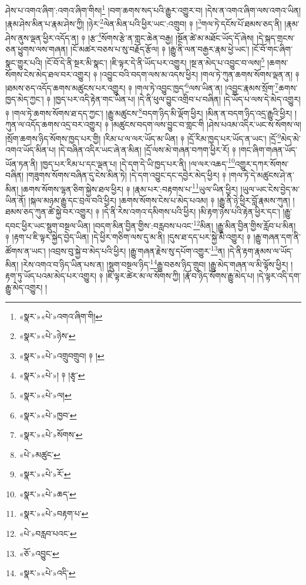 ཤེས་པ་འགའ་ཞིག་:འགའ་ཞིག་གིས།\footnote{«སྣར་»«པེ་»འགའ་ཞིག་གི།} །བག་ཆགས་སད་པའི་རྒྱུར་འགྱུར་བ། །དེས་ན་འགའ་ཞིག་ལས་འགའ་ཡིན། །རྣམ་ཤེས་མིན་པ་རྣམ་ཤེས་ཀྱི། །ཉེར་\footnote{«སྣར་»«པེ་»ཉེས་}ལེན་མིན་པའི་ཕྱིར་ཡང་:འགྲུབ། ༈ །\footnote{«སྣར་»«པེ་»འགྲུབགྲུབ། ༈ །}གལ་ཏེ་དངོས་པོ་ཐམས་ཅད་ནི། །རྣམ་ཤེས་ནུས་ལྡན་ཕྱིར་འདོད་ན། ༈ །རྩ་\footnote{«སྣར་»«པེ་»། ༈ །རྩྭ་}སོགས་རྩེ་ན་གླང་ཆེན་བརྒྱ། །སྔོན་ཚེ་མ་མཐོང་ཡོད་དོ་ཞེས། །དེ་སྐད་གྲངས་ཅན་ཕྱུགས་ལས་གཞན། །ངོ་མཚར་བཅས་པ་སུ་བརྗོད་རྩོལ། ༈ །རྒྱུ་ནི་ལན་བརྒྱར་རྣམ་ཕྱེ་ཡང་། །ངོ་བོ་གང་ཞིག་སྣང་གྱུར་པའི། །ངོ་བོ་དེ་ནི་སྔར་མི་སྣང་། །ཇི་ལྟར་དེ་ནི་ཡོད་པར་འགྱུར། །སྔ་ན་མེད་པ་འབྱུང་བ་ལས།\footnote{«སྣར་»«པེ་»ལ།} །ཆགས་སོགས་ངེས་མེད་ཐལ་བར་འགྱུར། ༈ །འབྱུང་བའི་བདག་ལས་མ་འདས་ཕྱིར། །གལ་ཏེ་ཀུན་ཆགས་སོགས་ལྡན་ན། ༈ །ཐམས་ཅད་འདོད་ཆགས་མཚུངས་པར་འགྱུར། ༈ །གལ་ཏེ་འབྱུང་ཁྱད་\footnote{«སྣར་»«པེ་»ཁྱབ་}ལས་ཡིན་ན། །འབྱུང་རྣམས་སྲོག་\footnote{«སྣར་»«པེ་»སོགས་}ཆགས་ཁྱད་མེད་ཀྱང་། ༈ །ཁྱད་པར་འདི་རྟེན་གང་ཡིན་པ། །དེ་ནི་ཕུལ་བྱུང་འགྲིབ་པ་བཞིན། །དེ་ཡོད་པ་ལས་དེ་མེད་འགྱུར། ༈ །གལ་ཏེ་ཆགས་སོགས་ཐ་དད་ཀྱང་། །རྒྱུ་མཚུངས་\footnote{«པེ་»མཚུང་}བདག་ཉིད་མི་ལྡོག་ཕྱིར། །མིན་ན་བདག་ཉིད་འདྲ་རྒྱུའི་ཕྱིར། །ཀུན་ལ་འདོད་ཆགས་འདྲ་བར་འགྱུར། ༈ །མཚུངས་བདག་ལས་བྱུང་བ་གླང་གི །ཤེས་པའམ་འདིར་ཡང་ས་སོགས་ལ། །སྲོག་ཆགས་ཉིད་སོགས་ཁྱད་པར་གྱི། །རིམ་པ་ལ་ལར་ཡོད་མ་ཡིན། ༈ །དྲོ་རིམ་ཁྱད་པར་ཡོད་ན་ཡང་། །དྲོ་\footnote{«སྣར་»«པེ་»རོ་}མེད་མེ་འགའ་ཡོད་མིན་པ། །དེ་བཞིན་འདིར་ཡང་ཞེ་ན་མིན། །དྲོ་ལས་མེ་གཞན་བཀག་ཕྱིར་རོ། ༈ །གང་ཞིག་གཞན་ཡོད་ཡོན་ཏན་ནི། །ཁྱད་པར་རིམ་པ་དང་ལྡན་པ། །དེ་དག་དེ་ཡི་ཁྱད་པར་ནི། །ལ་ལར་འཆད་\footnote{«སྣར་»«པེ་»ཆད་}འགྱུར་དཀར་སོགས་བཞིན། །གཟུགས་སོགས་བཞིན་དུ་ངེས་མིན་ཏེ། །དེ་དག་འབྱུང་དང་དབྱེར་མེད་ཕྱིར། ༈ །གལ་ཏེ་དེ་མཚུངས་ཤེ་ན་མིན། །ཆགས་སོགས་ལྷན་ཅིག་སྐྱེས་ཐལ་ཕྱིར། ༈ །རྣམ་པར་:བརྟགས་པ་\footnote{«སྣར་»«པེ་»བརྟག་པ་}ཡུལ་ཡིན་ཕྱིར། །ཡུལ་ཡང་ངེས་བྱེད་མ་ཡིན་ནོ། །སྐལ་མཉམ་རྒྱུ་དང་བྲལ་བའི་ཕྱིར། །ཆགས་སོགས་ངེས་པ་མེད་པའམ། ༈ །རྒྱུ་ནི་ཉེ་ཕྱིར་བློ་རྣམས་ཀུན། །ཐམས་ཅད་ཀུན་ཚེ་སྐྱེ་བར་འགྱུར། ༈ །དེ་ནི་རེས་འགའ་དམིགས་པའི་ཕྱིར། །མི་རྟག་ཉེས་པའི་རྟེན་ཕྱིར་དང་། །རྒྱུ་དབང་ཕྱིར་ཡང་སྡུག་བསྔལ་ཡིན། །བདག་མིན་བྱིན་གྱིས་:བརླབས་པའང་\footnote{«པེ་»བརླབ་པའང་}མིན། །རྒྱུ་མིན་བྱིན་གྱིས་རློབ་པ་མིན། ༈ །རྟག་པ་ཇི་ལྟར་སྐྱེད་བྱེད་ཡིན། །དེ་ཕྱིར་གཅིག་ལས་དུ་མ་ནི། །དུས་ཐ་དད་པར་སྐྱེ་མི་འགྱུར། ༈ །རྒྱུ་གཞན་དག་ནི་ཚོགས་ན་ཡང་། །འབྲས་བུ་སྐྱེ་བ་མེད་པའི་ཕྱིར། །རྒྱུ་གཞན་རྗེས་སུ་དཔོག་འགྱུར་\footnote{«ཅོ་»འབྱུང་}ན། །དེ་ནི་རྟག་རྣམས་ལ་ཡོད་མིན། །རེས་འགའ་བ་ཉིད་ཡིན་པས་ན། །སྡུག་བསྔལ་ཉིད་\footnote{«སྣར་»«པེ་»འདི་}རྒྱུ་བཅས་ཉིད་གྲུབ། །རྒྱུ་མེད་གཞན་ལ་མི་ལྟོས་ཕྱིར། །རྟག་ཏུ་ཡོད་པའམ་མེད་པར་འགྱུར། ༈ །ཇི་ལྟར་ཚེར་མ་ལ་སོགས་ཀྱི། །རྣོ་བ་ཉིད་སོགས་རྒྱུ་མེད་པ། །དེ་ལྟར་འདི་དག་རྒྱུ་མེད་འགྱུར། །
